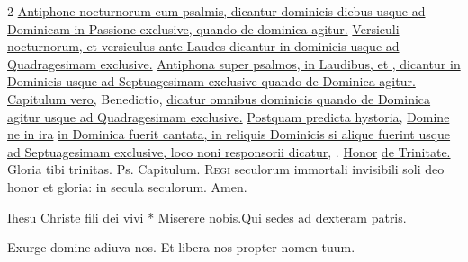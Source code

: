 \begin{multicols*}{2}
\newline \ul{Antiphone nocturnorum cum psalmis, dicantur dominicis diebus usque ad Dominicam in Passione exclusive, quando de dominica agitur.}
\newline \ul{Versiculi nocturnorum, et versiculus ante Laudes dicantur in dominicis usque ad Quadragesimam exclusive.}
\newline \ul{Antiphona super psalmos, in Laudibus, et \Vbar , dicantur in Dominicis usque ad Septuagesimam exclusive quando de Dominica agitur.}
\newline \ul{Capitulum vero,} Benedictio, \ul{dicatur omnibus dominicis quando de Dominica agitur usque ad Quadragesimam exclusive.}
\newline \ul{Postquam predicta hystoria,} \hyperlink{domine-ne-in-ira}{Domine ne in ira} \ul{in Dominica fuerit cantata, in reliquis Dominicis si alique fuerint usque ad Septuagesimam exclusive, loco noni responsorii dicatur,} \Rbar . \hyperlink{honor-virtus}{Honor} \ul{de Trinitate.}
 Gloria tibi trinitas. {\color{Red} Ps.}     {\color{Red} Capitulum.}
\lettrine[lines=2]{\zallmancaps \color{Blue} R}{egi} seculorum immortali invisibili soli deo honor et gloria: in secula seculorum. Amen.
\begin{responsory-breve}
{Ihesu Christe fili dei vivi * Miserere nobis.}{Qui sedes ad dexteram patris.}
\end{responsory-breve}%
\newline \V Exurge domine adiuva nos.
\newline \R Et libera nos propter nomen tuum.

\end{multicols*}
